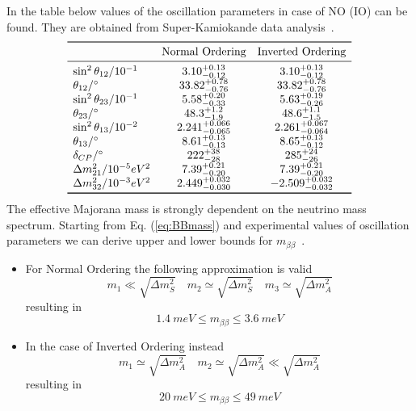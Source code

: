 \documentclass{subnucbo}
\begin{document}
In the table below values of the oscillation parameters in case of NO (IO) can be found. They are obtained from Super-Kamiokande data analysis~\cite[sec.14]{ref:pdg}. 
\[
\begin{array}{lcc}
\toprule
&\text{Normal Ordering}&\text{Inverted Ordering}\\
\midrule
\sin^2\theta_{12}/10^{-1}&3.10_{-0.12}^{+0.13}&3.10_{-0.12}^{+0.13}\\
\theta_{12}/\si{\degree}&33.82_{-0.76}^{+0.78}&33.82_{-0.76}^{+0.78}\\
\sin^2\theta_{23}/10^{-1}&5.58_{-0.33}^{+0.20}&5.63_{-0.26}^{+0.19}\\
\theta_{23}/\si{\degree}&48.3_{-1.9}^{+1.2}&48.6_{-1.5}^{+1.1}\\
\sin^2\theta_{13}/10^{-2}&2.241_{-0.065}^{+0.066}&2.261_{-0.064}^{+0.067}\\
\theta_{13}/\si{\degree}&8.61_{-0.13}^{+0.13}&8.65_{-0.12}^{+0.13}\\
\delta_{CP}/\si{\degree}&222_{-28}^{+38}&285_{-26}^{+24}\\
\Delta m^2_{21}/10^{-5}eV^2&7.39_{-0.20}^{+0.21}&7.39_{-0.20}^{+0.21}\\
\Delta m_{32}^2/10^{-3}eV^2&2.449_{-0.030}^{+0.032}&-2.509_{-0.032}^{+0.032}\\
\bottomrule
\end{array}
\]
The effective Majorana mass is strongly dependent on the neutrino mass spectrum. Starting from Eq. (\ref{eq:BBmass}) and experimental values of oscillation parameters we can derive upper and lower bounds for $m_{\beta\beta}$~\cite{ref:ver}.
\begin{itemize}
\item For Normal Ordering the following approximation is valid
	\begin{equation}
	m_1\ll\sqrt{\Delta m_S^2} \quad m_2\simeq\sqrt{\Delta m_S^2} \quad m_3\simeq\sqrt{\Delta m_A^2}
	\end{equation}
	resulting in 
	\begin{equation}
	\SI{1.4}{meV} \leq m_{\beta\beta} \leq \SI{3.6}{meV}
	\end{equation}
\item In the case of Inverted Ordering instead
	\begin{equation}
	m_1\simeq\sqrt{\Delta m_A^2} \quad m_2\simeq\sqrt{\Delta m_A^2} \ll\sqrt{\Delta m_A^2}
	\end{equation}
	resulting in
	\begin{equation}
	\SI{20}{meV}\leq m_{\beta\beta} \leq \SI{49}{meV}
	\end{equation}
\end{itemize}
\end{document}

